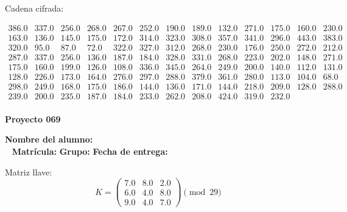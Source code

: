 \documentclass[12pt]{article}
\begin{document}
Cadena cifrada:
\begin{center}
$\begin{array}{lllllllllllll}
386.0 & 337.0 & 256.0 & 268.0 & 267.0 & 252.0 & 190.0 & 189.0 & 132.0 & 271.0 & 175.0 & 160.0 & 230.0\\
163.0 & 136.0 & 145.0 & 175.0 & 172.0 & 314.0 & 323.0 & 308.0 & 357.0 & 341.0 & 296.0 & 443.0 & 383.0\\
320.0 & 95.0 & 87.0 & 72.0 & 322.0 & 327.0 & 312.0 & 268.0 & 230.0 & 176.0 & 250.0 & 272.0 & 212.0\\
287.0 & 337.0 & 256.0 & 136.0 & 187.0 & 184.0 & 328.0 & 331.0 & 268.0 & 223.0 & 202.0 & 148.0 & 271.0\\
175.0 & 160.0 & 199.0 & 126.0 & 108.0 & 336.0 & 345.0 & 264.0 & 249.0 & 200.0 & 140.0 & 112.0 & 131.0\\
128.0 & 226.0 & 173.0 & 164.0 & 276.0 & 297.0 & 288.0 & 379.0 & 361.0 & 280.0 & 113.0 & 104.0 & 68.0\\
298.0 & 249.0 & 168.0 & 175.0 & 186.0 & 144.0 & 136.0 & 171.0 & 144.0 & 218.0 & 209.0 & 128.0 & 288.0\\
239.0 & 200.0 & 235.0 & 187.0 & 184.0 & 233.0 & 262.0 & 208.0 & 424.0 & 319.0 & 232.0\\
\end{array}$
\end{center}

\newpage


\textbf{Proyecto 069}

\textbf{Nombre del alumno:} \underline{\hspace{13cm}}\\\
\vspace{1cm}
\textbf{Matrícula:} \underline{\hspace{4cm}} \hspace{1cm}
\textbf{Grupo:} \underline{\hspace{2cm}}
\textbf{Fecha de entrega:} \underline{\hspace{2cm}}

\medskip

Matriz llave:
\[
K = \begin{pmatrix}
7.0 & 8.0 & 2.0\\
6.0 & 4.0 & 8.0\\
9.0 & 4.0 & 7.0
\end{pmatrix} \pmod{29}
\]
\end{document}

